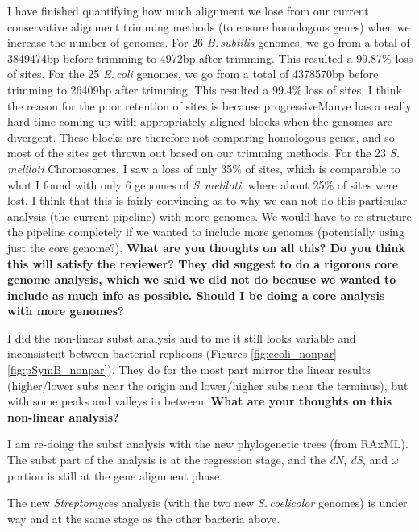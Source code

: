 \documentclass[12pt]{article}
\newcommand{\smel}{\textit{S.\,meliloti}\xspace}
\newcommand{\p}{progressiveMauve\xspace}
\newcommand{\strep}{\textit{Streptomyces}\xspace}
\newcommand{\bass}{\textit{B.\,subtilis}\xspace}
\newcommand{\ecol}{\textit{E.\,coli}\xspace}
\newcommand{\scoe}{\textit{S.\,coelicolor}\xspace}
\newcommand{\dn}{\textit{dN}\xspace}
\newcommand{\ds}{\textit{dS}\xspace}
\begin{document}
I have finished quantifying how much alignment we lose from our current conservative alignment trimming methods (to ensure homologous genes) when we increase the number of genomes.
For 26 \bass genomes, we go from a total of 3849474bp before trimming to 4972bp after trimming.
This resulted a 99.87\% loss of sites.
For the 25 \ecol genomes, we go from a total of 4378570bp before trimming to 26409bp after trimming.
This resulted a 99.4\% loss of sites.
I think the reason for the poor retention of sites is because \p has a really hard time coming up with appropriately aligned blocks when the genomes are divergent.
These blocks are therefore not comparing homologous genes, and so most of the sites get thrown out based on our trimming methods.
For the 23 \smel Chromosomes, I saw a loss of only 35\% of sites, which is comparable to what I found with only 6 genomes of \smel, where about 25\% of sites were lost.
I think that this is fairly convincing as to why we can not do this particular analysis (the current pipeline) with more genomes.
We would have to re-structure the pipeline completely if we wanted to include more genomes (potentially using just the core genome?).
\textbf{What are you thoughts on all this? Do you think this will satisfy the reviewer? They did suggest to do a rigorous core genome analysis, which we said we did not do because we wanted to include as much info as possible. Should I be doing a core analysis with more genomes?}


I did the non-linear subst analysis and to me it still looks variable and inconsistent between bacterial replicons (Figures \ref{fig:ecoli_nonpar} - \ref{fig:pSymB_nonpar}).
They do for the most part mirror the linear results (higher/lower subs near the origin and lower/higher subs near the terminus), but with some peaks and valleys in between.
\textbf{What are your thoughts on this non-linear analysis?}




I am re-doing the subst analysis with the new phylogenetic trees (from RAxML).
The subst part of the analysis is at the regression stage, and the \dn, \ds, and $\omega$ portion is still at the gene alignment phase.

The new \strep analysis (with the two new \scoe genomes) is under way and at the same stage as the other bacteria above.




\end{document}
